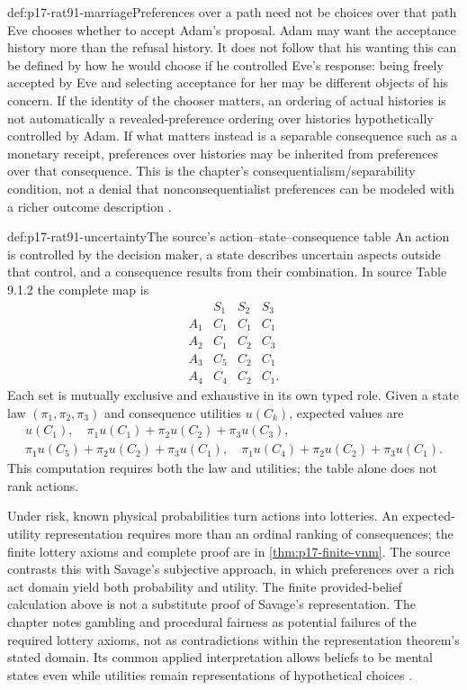 \begin{hbexample}{def:p17-rat91-marriage}{Preferences over a path need not be choices over that path}
Eve chooses whether to accept Adam's proposal. Adam may want the
acceptance history more than the refusal history. It does not follow
that his wanting this can be defined by how he would choose if he
controlled Eve's response: being freely accepted by Eve and selecting
acceptance for her may be different objects of his concern.
If the identity of the chooser matters, an ordering of actual
histories is not automatically a revealed-preference ordering over
histories hypothetically controlled by Adam. If what matters instead
is a separable consequence such as a monetary receipt, preferences
over histories may be inherited from preferences over that consequence.
This is the chapter's consequentialism/separability condition, not a
denial that nonconsequentialist preferences can be modeled with a richer
outcome description \parencite[p.~536]{AlbertKliemt2021ClassicalGameTheory}.
\end{hbexample}

\begin{hbdefinition}{def:p17-rat91-uncertainty}{The source's action--state--consequence table}
An action is controlled by the decision maker, a state describes
uncertain aspects outside that control, and a consequence results
from their combination. In source Table 9.1.2 the complete map is
\[
\begin{array}{c|ccc}&S_1&S_2&S_3\\\hline
 A_1&C_1&C_1&C_1\\A_2&C_1&C_2&C_3\\
 A_3&C_5&C_2&C_1\\A_4&C_4&C_2&C_1.
\end{array}
\]
Each set is mutually exclusive and exhaustive in its own typed role.
Given a state law \((\pi_1,\pi_2,\pi_3)\) and consequence
utilities \(u(C_k)\), expected values are
\[
\begin{split}
 u(C_1),\quad
 \pi_1u(C_1)+\pi_2u(C_2)+\pi_3u(C_3),\\
 \pi_1u(C_5)+\pi_2u(C_2)+\pi_3u(C_1),\quad
 \pi_1u(C_4)+\pi_2u(C_2)+\pi_3u(C_1).
\end{split}
\]
This computation requires both the law and utilities; the table
alone does not rank actions.
\end{hbdefinition}

Under risk, known physical probabilities turn actions into lotteries.
An expected-utility representation requires more than an ordinal
ranking of consequences; the finite lottery axioms and complete proof
are in \cref{thm:p17-finite-vnm}. The source contrasts this with
Savage's subjective approach, in which preferences over a rich act
domain yield both probability and utility. The finite provided-belief
calculation above is not a substitute proof of Savage's representation.
The chapter notes gambling and procedural fairness as potential failures
of the required lottery axioms, not as contradictions within the
representation theorem's stated domain. Its common applied interpretation
allows beliefs to be mental states even while utilities remain
representations of hypothetical choices
\parencite[pp.~536--537]{AlbertKliemt2021ClassicalGameTheory}.

